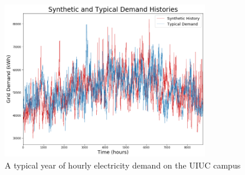 \begin{figure}
  \centering
  \includegraphics[width=0.8\textwidth]{syntypdemand}
  \caption{A typical year of hourly electricity demand on the UIUC campus}
  \label{fig:synelc}
\end{figure}
